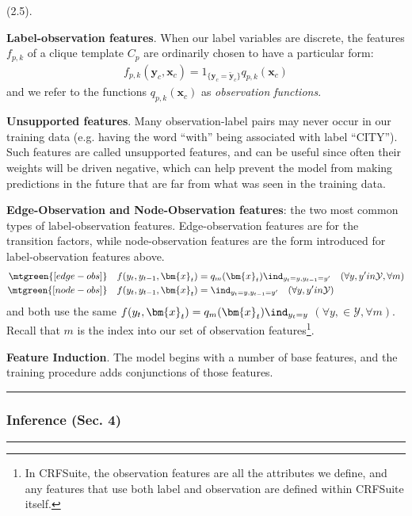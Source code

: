 \documentclass[11pt]{article}
\renewcommand\vec[2][]{\bm{#2}_{#1}}
\newcommand\myspace[1][]{\vspace{#1\bigskipamount}}
\newcommand\p{\Needspace{10\baselineskip} \noindent}
\newcommand\subsub[1]{\Needspace{15\baselineskip}\hrule\subsubsection{#1}\hrule}
\begin{document}
\myspace
\p {} (2.5). 
\begin{compactitem}
	\item \textbf{Label-observation features}. When our label variables are discrete, the features $f_{p,k}$ of a clique template $C_p$ are ordinarily chosen to have a particular form:
	\begin{align}
		f_{p,k}(\vec[c]{y}, \vec[c]{x}) = 1_{\{ \vec[c]{y} = \vec[c]{\widetilde y} \}} q_{p,k}(\vec[c]{x})
	\end{align}
	and we refer to the functions $q_{p,k}(\vec[c]{x})$ as \textit{observation functions}.
	
	\item \textbf{Unsupported features}. Many observation-label pairs may never occur in our training data (e.g. having the word ``with'' being associated with label ``CITY''). Such features are called unsupported features, and can be useful since often their weights will be driven negative, which can help prevent the model from making predictions in the future that are far from what was seen in the training data.
	
	\item \textbf{Edge-Observation and Node-Observation features}: the two most common types of label-observation features. Edge-observation features are for the transition factors, while node-observation features are the form introduced for label-observation features above.
	\begin{align}
		\mtgreen{[edge-obs]} \quad f(y_t, y_{t - 1}, \vec[t]{x}) &= q_m(\vec[t]{x})\ind_{y_t=y,y_{t-1}=y'} \quad (\forall y, y' in \mathcal{Y}, \forall m) \\
		\mtgreen{[node-obs]} \quad f(y_t, y_{t - 1}, \vec[t]{x}) &= \ind_{y_t=y,y_{t-1}=y'} \quad (\forall y, y' in \mathcal{Y})
	\end{align}
	and both use the same $f(y_t, \vec[t]{x}) = q_m(\vec[t]{x}) \ind_{y_t = y}$ $(\forall y, \in \mathcal{Y}, \forall m)$. Recall that $m$ is the index into our set of observation features\footnote{In CRFSuite, the observation features are all the attributes we define, and any features that use both label and observation are defined within CRFSuite itself.}.
	
	\item \textbf{Feature Induction}. The model begins with a number of base features, and the training procedure adds conjunctions of those features.
\end{compactitem}


\myspace{}
\subsub{Inference (Sec. 4)}
\myspace
\end{document}

